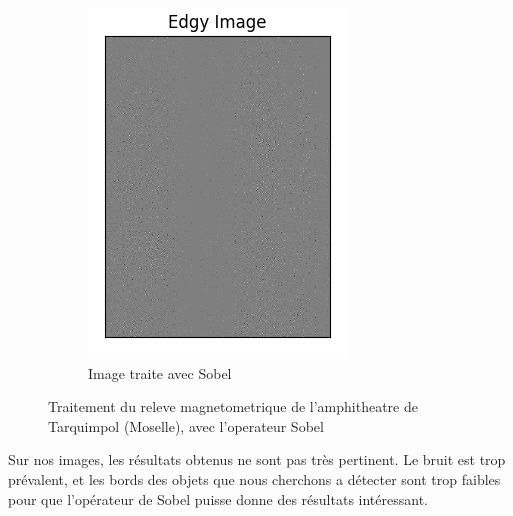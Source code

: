 \documentclass[a4paper, 12pt, titlepage, oneside, french]{article}
\begin{document}
\begin{figure}[]
\begin{subfigure}[b]{0.4\linewidth}
			\includegraphics[width=\linewidth]{Sobel1a.png}
			\caption{Image traite avec Sobel}
			
		\end{subfigure}
		\caption{Traitement du releve magnetometrique de l'amphitheatre de Tarquimpol (Moselle), avec l'operateur Sobel}
		\label{fig:OurSobel}
	\end{figure}

	Sur nos images, les résultats obtenus ne sont pas très pertinent. Le bruit est trop prévalent, et les bords des objets que nous cherchons a détecter sont trop faibles pour que l'opérateur de Sobel puisse donne des résultats intéressant.
\end{document}
